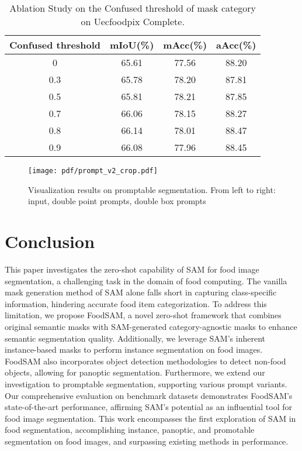 \documentclass[lettersize,journal]{IEEEtran}
\begin{document}
\begin{table}
\centering
\caption{Ablation Study on the Confused threshold of mask category on Uecfoodpix Complete.}
\begin{tabular}{c|ccc}
\hline
\textbf{Confused threshold}             & \textbf{mIoU(\%)} & \textbf{mAcc(\%)} & \textbf{aAcc(\%)} \\ \hline
0                        & 65.61      & 77.56       & 88.20                             \\
0.3                      & 65.78      & 78.20       & 87.81                             \\ 
0.5                      & 65.81      &  78.21      & 87.85                              \\
0.7                      & 66.06      & 78.15       & 88.27                             \\
0.8                      & 66.14      & 78.01       & 88.47                             \\
0.9                      & 66.08      & 77.96       & 88.45                             \\ \hline
\end{tabular}
\captionsetup{justification=centering}
\label{tab:ablation_uec_thres}
\end{table}
 
\begin{figure*}[tbh]
\centering
\newpage
\texttt{[image: pdf/prompt\_v2\_crop.pdf]}
\caption{Visualization results on promptable segmentation. From left to right: input, double point prompts, double box prompts}
\label{fig: prompt vis}
\end{figure*}
     
\section{Conclusion}
This paper investigates the zero-shot capability of SAM for food image segmentation, a challenging task in the domain of food computing. 
The vanilla mask generation method of SAM alone falls short in capturing class-specific information, hindering accurate food item categorization. 
To address this limitation, we propose FoodSAM, a novel zero-shot framework that combines original semantic masks with SAM-generated category-agnostic masks to enhance semantic segmentation quality. 
Additionally, we leverage SAM's inherent instance-based masks to perform instance segmentation on food images. 
FoodSAM also incorporates object detection methodologies to detect non-food objects, allowing for panoptic segmentation. 
Furthermore, we extend our investigation to promptable segmentation, supporting various prompt variants. 
Our comprehensive evaluation on benchmark datasets demonstrates FoodSAM's state-of-the-art performance, 
affirming SAM's potential as an influential tool for food image segmentation. 
This work encompasses the first exploration of SAM in food segmentation, accomplishing instance, panoptic, and promotable segmentation on food images, and surpassing existing methods in performance.
 


\end{document}

